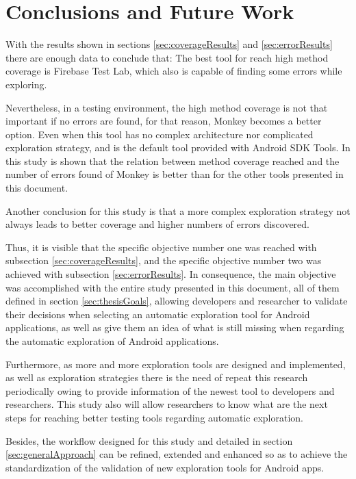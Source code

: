 
\chapter{Conclusions and Future Work} %
\label{Chapter5}

With the results shown in sections \ref{sec:coverageResults} and \ref{sec:errorResults} there are enough data to conclude that: The best tool for reach high method coverage is Firebase Test Lab, which also is capable of finding some errors while exploring.

Nevertheless, in a testing environment, the high method coverage is not that important if no errors are found, for that reason, Monkey becomes a better option. Even when this tool has no complex architecture nor complicated exploration strategy, and is the default tool provided with Android SDK Tools. In this study is shown that the relation between method coverage reached and the number of errors found of Monkey is better than for the other tools presented in this document. 

Another conclusion for this study is that a more complex exploration strategy not always leads to better coverage and higher numbers of errors discovered.

Thus, it is visible that the specific objective number one was reached with subsection \ref{sec:coverageResults}, and the specific objective number two was achieved with subsection \ref{sec:errorResults}. In consequence, the main objective was accomplished with the entire study presented in this document, all of them defined in section \ref{sec:thesisGoals}, allowing developers and researcher to validate their decisions when selecting an automatic exploration tool for Android applications, as well as give them an idea of what is still missing when regarding the automatic exploration of Android applications. 

Furthermore, as more and more exploration tools are designed and implemented, as well as exploration strategies there is the need of repeat this research periodically owing to provide information of the newest tool to developers and researchers. This study also will allow researchers to know what are the next steps for reaching better testing tools regarding automatic exploration. 

Besides, the workflow designed for this study and detailed in section \ref{sec:generalApproach} can be refined, extended and enhanced so as to achieve the standardization of the validation of new exploration tools for Android apps. 

